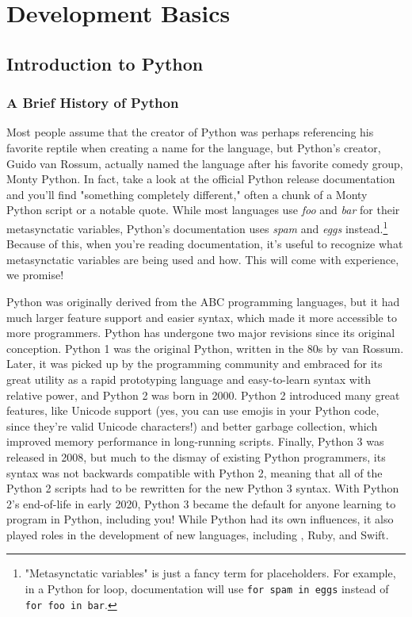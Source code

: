 \chapter{Development Basics}
\section{Introduction to Python}
\subsection{A Brief History of Python}
Most people assume that the creator of Python was perhaps referencing his favorite reptile when creating a name for the language, but Python's creator, Guido van Rossum, actually named the language after his favorite comedy group, Monty Python. In fact, take a look at the official Python release documentation and you'll find "something completely different," often a chunk of a Monty Python script or a notable quote. While most languages use \textit{foo} and \textit{bar} for their metasynctatic variables, Python's documentation uses \textit{spam} and \textit{eggs} instead.\cprotect\footnote{"Metasynctatic variables" is just a fancy term for placeholders. For example, in a Python for loop, documentation will use \verb|for spam in eggs| instead of \verb|for foo in bar|.} Because of this, when you're reading documentation, it's useful to recognize what metasynctatic variables are being used and how. This will come with experience, we promise!\par
Python was originally derived from the ABC programming languages, but it had much larger feature support and easier syntax, which made it more accessible to more programmers. Python has undergone two major revisions since its original conception. Python 1 was the original Python, written in the 80s by van Rossum. Later, it was picked up by the programming community and embraced for its great utility as a rapid prototyping language and easy-to-learn syntax with relative power, and Python 2 was born in 2000. Python 2 introduced many great features, like Unicode support (yes, you can use emojis in your Python code, since they're valid Unicode characters!) and better garbage collection, which improved memory performance in long-running scripts. Finally, Python 3 was released in 2008, but much to the dismay of existing Python programmers, its syntax was not backwards compatible with Python 2, meaning that all of the Python 2 scripts had to be rewritten for the new Python 3 syntax. With Python 2's end-of-life in early 2020, Python 3 became the default for anyone learning to program in Python, including you!
While Python had its own influences, it also played roles in the development of new languages, including , Ruby, and Swift.\par
